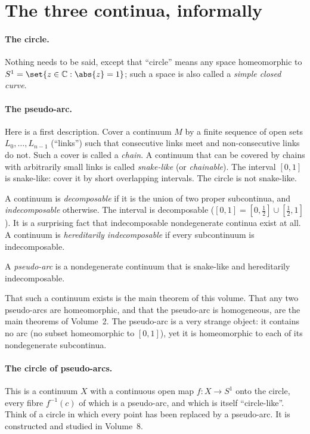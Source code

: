 \section{The three continua, informally}

\paragraph{The circle.} Nothing needs to be said, except that ``circle'' means any space
homeomorphic to $S^1=\set{z\in\mathbb{C} : \abs{z}=1}$; such a space is also called a
\emph{simple closed curve}.

\paragraph{The pseudo-arc.} Here is a first description. Cover a continuum $M$ by a finite
sequence of open sets $L_0,\dots,L_{n-1}$ (``links'') such that consecutive links meet and
non-consecutive links do not. Such a cover is called a \emph{chain}. A continuum that can
be covered by chains with arbitrarily small links is called \emph{snake-like} (or
\emph{chainable}). The interval $[0,1]$ is snake-like: cover it by short overlapping
intervals. The circle is not snake-like.

A continuum is \emph{decomposable} if it is the union of two proper subcontinua, and
\emph{indecomposable} otherwise. The interval is decomposable ($[0,1]=[0,\frac12]\cup
[\frac12,1]$). It is a surprising fact that indecomposable nondegenerate continua exist at
all. A continuum is \emph{hereditarily indecomposable} if every subcontinuum is
indecomposable.

\begin{definition}\label{def:pseudoarc-intro}
A \emph{pseudo-arc} is a nondegenerate continuum that is snake-like and hereditarily
indecomposable.
\end{definition}

That such a continuum exists is the main theorem of this volume. That any two pseudo-arcs
are homeomorphic, and that the pseudo-arc is homogeneous, are the main theorems of
Volume~2. The pseudo-arc is a very strange object: it contains no arc (no subset
homeomorphic to $[0,1]$), yet it is homeomorphic to each of its nondegenerate
subcontinua.

\paragraph{The circle of pseudo-arcs.} This is a continuum $X$ with a continuous open map
$f\colon X\to S^1$ onto the circle, every fibre $f^{-1}(c)$ of which is a pseudo-arc, and
which is itself ``circle-like''. Think of a circle in which every point has been replaced
by a pseudo-arc. It is constructed and studied in Volume~8.

